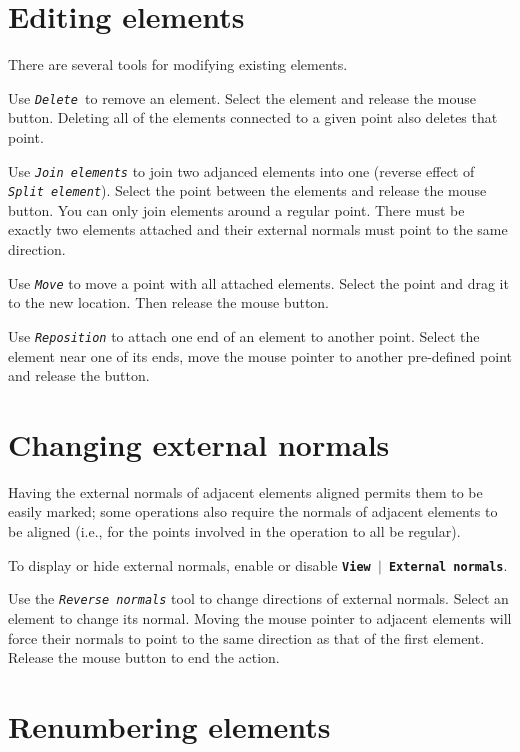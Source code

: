 \documentclass[12pt]{report}
\begin{document}
\section{Editing elements}

There are several tools for modifying existing elements.

Use \textit{\texttt{Delete }}to remove an element. Select the element
and release the mouse button. Deleting all of the elements connected
to a given point also deletes that point.

Use \textit{\texttt{Join elements}} to join two adjanced elements into
one (reverse effect of \textit{\texttt{Split element}}). Select the
point between the elements and release the mouse button. You can only
join elements around a regular point. There must be exactly two
elements attached and their external normals must point to the same
direction.

Use \textit{\texttt{Move}} to move a point with all attached
elements. Select the point and drag it to the new location. Then
release the mouse button.

Use \textit{\texttt{Reposition}} to attach one end of an element to
another point. Select the element near one of its ends, move the mouse
pointer to another pre-defined point and release the button.

\section{Changing external normals}

Having the external normals of adjacent elements aligned permits them
to be easily marked; some operations also require the normals of
adjacent elements to be aligned (i.e., for the points involved in the
operation to 
all be regular). 

To display or hide external normals, enable or disable
\textbf{\texttt{View  \begin{math}\vert{}\end{math}  External normals}}.

Use the \textit{\texttt{Reverse normals}} tool to change directions of
external normals. Select an element to change its normal. Moving the
mouse pointer to adjacent elements will force their normals to point to
the same direction as that of the first element. Release the mouse
button to end the action.

\section{Renumbering elements}
\end{document}
